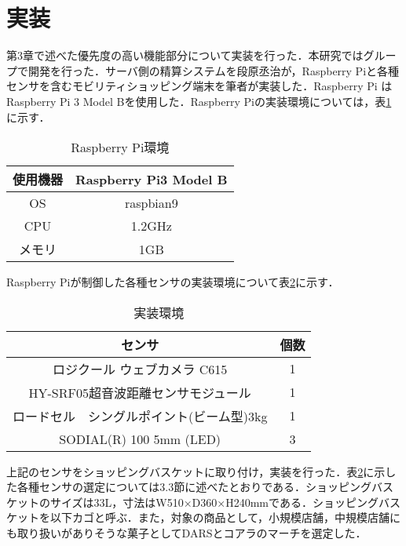 

\section{実装}

第3章で述べた優先度の高い機能部分について実装を行った．本研究ではグループで開発を行った．サーバ側の精算システムを段原丞治が，Raspberry Piと各種センサを含むモビリティショッピング端末を筆者が実装した．Raspberry Pi はRaspberry Pi 3 Model Bを使用した．Raspberry Piの実装環境については，表\ref{rasp}に示す．


\begin{table}[htb]
\begin{center}
\caption{Raspberry Pi環境}
\begin{tabular}{|c||c|} \hline
使用機器 & Raspberry Pi3 Model B \\ \hline
OS & raspbian9 \\ \hline
CPU & 1.2GHz \\ \hline
メモリ & 1GB \\ \hline
\end{tabular}
\label{rasp}
\end{center}
\end{table}


Raspberry Piが制御した各種センサの実装環境について表\ref{jissou}に示す．


\begin{table}[htb]
\begin{center}
\caption{実装環境}
\begin{tabular}{|c|c|} \hline
センサ & 個数 \\ \hline \hline
ロジクール ウェブカメラ C615 & 1 \\
HY-SRF05超音波距離センサモジュール & 1 \\
ロードセル　シングルポイント(ビーム型)3kg & 1 \\
SODIAL(R) 100 5mm (LED) & 3 \\ \hline
\end{tabular}
\label{jissou}
\end{center}
\end{table}


上記のセンサをショッピングバスケットに取り付け，実装を行った．表\ref{jissou}に示した各種センサの選定については3.3節に述べたとおりである．ショッピングバスケットのサイズは33L，寸法はW510×D360×H240mmである．ショッピングバスケットを以下カゴと呼ぶ．また，対象の商品として，小規模店舗，中規模店舗にも取り扱いがありそうな菓子としてDARSとコアラのマーチを選定した．

